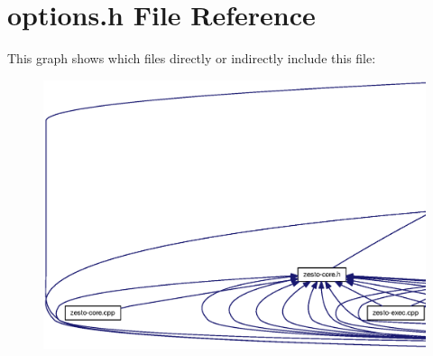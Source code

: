 \section{options.h File Reference}
\label{options_8h}


This graph shows which files directly or indirectly include this file:\nopagebreak
\begin{figure}[H]
\begin{center}
\leavevmode
\includegraphics[width=420pt]{options_8h__dep__incl}
\end{center}
\end{figure}
